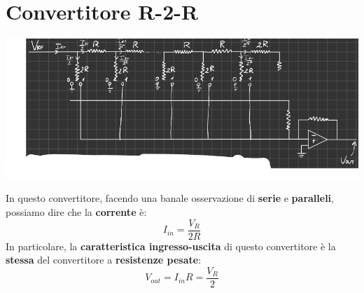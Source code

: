 \section{Convertitore R-2-R}
\begin{center}
    \includegraphics[width=\textwidth]{Images/figure38.png}
\end{center}
In questo convertitore, facendo una banale osservazione di \textbf{serie} e \textbf{paralleli}, possiamo dire che la \textbf{corrente} è:
\begin{equation}
    I_{in}= \frac{V_R}{2R}
\end{equation}
In particolare, la \textbf{caratteristica ingresso-uscita} di questo convertitore è la \textbf{stessa} del convertitore a \textbf{resistenze pesate}:
\begin{equation}
   V_{out} =  I_{in} R= \frac{V_R}{2}
\end{equation}
